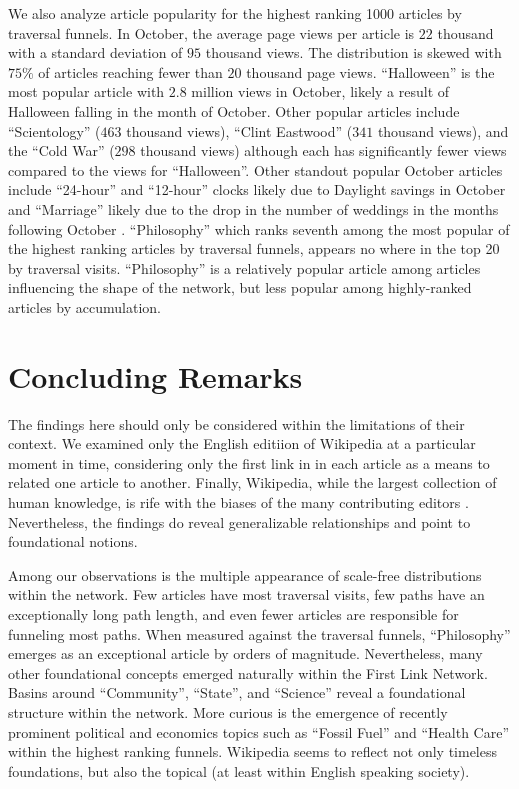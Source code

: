 \documentclass[pre,twocolumn,twoside,superscriptaddress,floatfix, aps, 10pt]{revtex4-1}
\begin{document}
We also analyze article popularity for the highest ranking 1000 articles by 
traversal funnels. In October, the average page views per article is 
$22$ thousand with a standard deviation of $95$ thousand views. The distribution
is skewed with $75\%$ of articles reaching fewer than $20$ thousand page views. 
``Halloween'' is the most popular article with $2.8$ million views in October,
likely a result of Halloween falling in the month of October. 
Other popular articles include ``Scientology'' ($463$ thousand views), ``Clint Eastwood'' 
($341$ thousand views),
and the ``Cold War'' ($298$ thousand views) although each has significantly fewer views compared to the views for ``Halloween''.
Other standout popular October articles include ``24-hour'' and ``12-hour'' clocks likely due
to Daylight savings in October and ``Marriage'' likely due to the drop in the number of
weddings in the months following October
\cite{weddings}.
``Philosophy'' which ranks seventh among the most popular of the highest ranking articles by traversal funnels, appears no where in the top 20
by traversal visits. ``Philosophy'' is a relatively popular article 
among articles influencing the shape of the network, but less popular among 
highly-ranked articles by accumulation.






\section{Concluding Remarks}

The findings here should only be considered within the limitations of their context.
We examined only the English editiion of Wikipedia at a particular moment in time, 
considering only the first link in in each article as a means to related one article to another.
Finally, Wikipedia, while the largest 
collection of human knowledge, is rife with the biases of the many contributing editors
\cite{bias}
. Nevertheless, the findings do reveal
generalizable relationships and point to foundational notions.


Among our observations is the multiple appearance of scale-free distributions within the network. 
Few articles have most traversal visits, few paths have an exceptionally long path length, and even fewer
articles are responsible for funneling most paths. When measured against the traversal funnels, 
``Philosophy'' emerges as an exceptional article by orders of magnitude. 
Nevertheless, many other foundational concepts emerged naturally within the First Link Network. 
Basins around ``Community'', ``State'', and ``Science'' reveal a foundational structure within the network. 
More curious is the emergence of recently prominent political and economics topics such as ``Fossil Fuel'' and ``Health Care'' 
within the highest ranking funnels. 
Wikipedia seems to reflect not only timeless foundations, but also the topical (at least within English speaking society).
\end{document}
